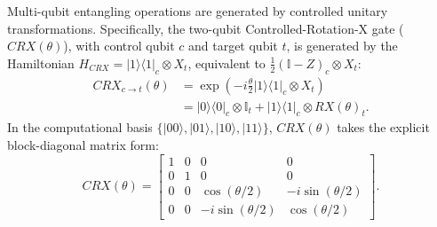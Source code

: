 \documentclass[journal]{IEEEtran}
\begin{document}
Multi-qubit entangling operations are generated by controlled unitary transformations. Specifically, the two-qubit Controlled-Rotation-X gate ($CRX(\theta)$), with control qubit $c$ and target qubit $t$, is generated by the Hamiltonian $H_{CRX} = |1\rangle\langle 1|_c \otimes X_t$, equivalent to $\frac{1}{2}(\mathbb{I} - Z)_c \otimes X_t$:
\begin{align}
CRX_{c \to t}(\theta) &= \exp\left(-i \frac{\theta}{2} |1\rangle\langle 1|_c \otimes X_t \right) \nonumber \\
&= |0\rangle\langle 0|_c \otimes \mathbb{I}_t + |1\rangle\langle 1|_c \otimes RX(\theta)_t.
\label{eq:crx_matrix}
\end{align}
In the computational basis $\{|00\rangle, |01\rangle, |10\rangle, |11\rangle\}$, $CRX(\theta)$ takes the explicit block-diagonal matrix form:
\begin{equation}
CRX(\theta) = \begin{bmatrix} 
1 & 0 & 0 & 0 \\ 
0 & 1 & 0 & 0 \\ 
0 & 0 & \cos(\theta/2) & -i\sin(\theta/2) \\ 
0 & 0 & -i\sin(\theta/2) & \cos(\theta/2) 
\end{bmatrix}.
\label{eq:crx_explicit_matrix}
\end{equation}
\end{document}
